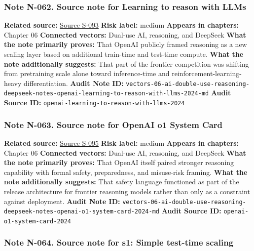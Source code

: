\documentclass[
  american,
  11pt,
  letterpaper,
]{article}
\begin{document}
\subsubsection{Note N-062. Source note for Learning to reason with
LLMs}\label{note-n-062-vectors-06-ai-double-use-reasoning-deepseek-notes-openai-learning-to-reason-with-llms-2024-md}

\textbf{Related source:}
\hyperref[source-s-093-learning-to-reason-with-llms]{Source S-093}
\textbf{Risk label:} medium \textbf{Appears in chapters:} Chapter 06
\textbf{Connected vectors:} Dual-use AI, reasoning, and DeepSeek
\textbf{What the note primarily proves:} That OpenAI publicly framed
reasoning as a new scaling layer based on additional train-time and
test-time compute. \textbf{What the note additionally suggests:} That
part of the frontier competition was shifting from pretraining scale
alone toward inference-time and reinforcement-learning-heavy
differentiation. \textbf{Audit Note ID:}
\texttt{vectors-06-ai-double-use-reasoning-deepseek-notes-openai-learning-to-reason-with-llms-2024-md}
\textbf{Audit Source ID:}
\texttt{openai-learning-to-reason-with-llms-2024}

\subsubsection{Note N-063. Source note for OpenAI o1 System
Card}\label{note-n-063-vectors-06-ai-double-use-reasoning-deepseek-notes-openai-o1-system-card-2024-md}

\textbf{Related source:}
\hyperref[source-s-095-openai-o1-system-card]{Source S-095} \textbf{Risk
label:} medium \textbf{Appears in chapters:} Chapter 06
\textbf{Connected vectors:} Dual-use AI, reasoning, and DeepSeek
\textbf{What the note primarily proves:} That OpenAI itself paired
stronger reasoning capability with formal safety, preparedness, and
misuse-risk framing. \textbf{What the note additionally suggests:} That
safety language functioned as part of the release architecture for
frontier reasoning models rather than only as a constraint against
deployment. \textbf{Audit Note ID:}
\texttt{vectors-06-ai-double-use-reasoning-deepseek-notes-openai-o1-system-card-2024-md}
\textbf{Audit Source ID:} \texttt{openai-o1-system-card-2024}

\subsubsection{Note N-064. Source note for s1: Simple test-time
scaling}\label{note-n-064-vectors-06-ai-double-use-reasoning-deepseek-notes-s1-simple-test-time-scaling-2025-md}
\end{document}
